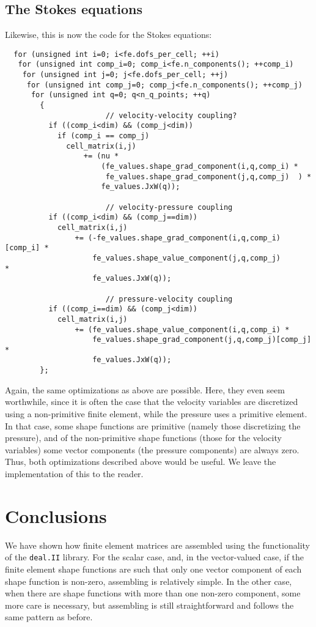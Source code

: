 \documentclass{article}
\begin{document}
\subsection{The Stokes equations}

Likewise, this is now the code for the Stokes equations:
\begin{verbatim}
  for (unsigned int i=0; i<fe.dofs_per_cell; ++i)
   for (unsigned int comp_i=0; comp_i<fe.n_components(); ++comp_i)
    for (unsigned int j=0; j<fe.dofs_per_cell; ++j)
     for (unsigned int comp_j=0; comp_j<fe.n_components(); ++comp_j)
      for (unsigned int q=0; q<n_q_points; ++q) 
        {
                       // velocity-velocity coupling?
          if ((comp_i<dim) && (comp_j<dim))
            if (comp_i == comp_j)
              cell_matrix(i,j)
                  += (nu *
                      (fe_values.shape_grad_component(i,q,comp_i) * 
                       fe_values.shape_grad_component(j,q,comp_j)  ) *
                      fe_values.JxW(q)); 

                       // velocity-pressure coupling
          if ((comp_i<dim) && (comp_j==dim))
            cell_matrix(i,j)
                += (-fe_values.shape_grad_component(i,q,comp_i)[comp_i] * 
                    fe_values.shape_value_component(j,q,comp_j)        *
                    fe_values.JxW(q)); 

                       // pressure-velocity coupling
          if ((comp_i==dim) && (comp_j<dim))
            cell_matrix(i,j)
                += (fe_values.shape_value_component(i,q,comp_i) * 
                    fe_values.shape_grad_component(j,q,comp_j)[comp_j] *
                    fe_values.JxW(q)); 
        };
\end{verbatim}
Again, the same optimizations as above are possible. Here, they even seem
worthwhile, since it is often the case that the velocity variables are
discretized using a non-primitive finite element, while the pressure uses a
primitive element. In that case, some shape functions are primitive (namely
those discretizing the pressure), and of the non-primitive shape functions
(those for the velocity variables) some vector components (the pressure
components) are always zero. Thus, both optimizations described above would be
useful. We leave the implementation of this to the reader.


\section{Conclusions}

We have shown how finite element matrices are assembled using the
functionality of the \texttt{deal.II} library. For the scalar case, and, in
the vector-valued case, if the
finite element shape functions are such that only one vector component of each
shape function is non-zero, assembling is relatively simple. In the other
case, when there are shape functions with more than one non-zero component,
some more care is necessary, but assembling is still straightforward and
follows the same pattern as before.
\end{document}
